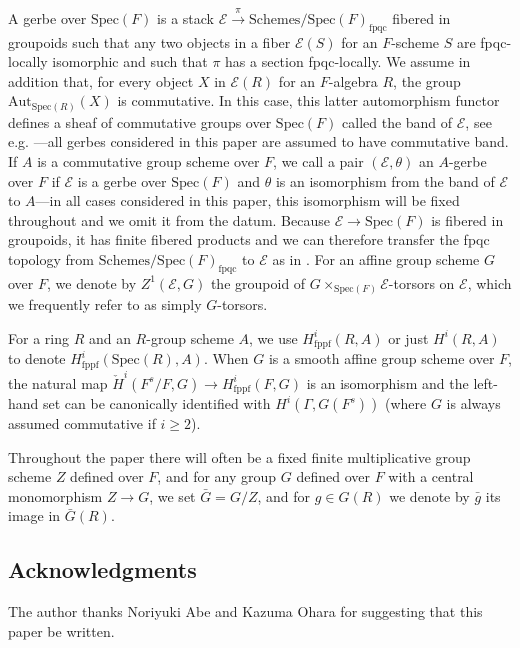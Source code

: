 \documentclass{amsart}
\theoremstyle{definition}
\theoremstyle{remark}
\newcommand\Spec{\mathrm{Spec}}
\begin{document}
A gerbe over $\Spec(F)$ is a stack $\mathcal{E} \xrightarrow{\pi} \text{Schemes/$\Spec(F)$}_{\text{fpqc}}$ fibered in groupoids such that any two objects in a fiber $\mathcal{E}(S)$ for an $F$-scheme $S$ are fpqc-locally isomorphic and such that $\pi$ has a section fpqc-locally. We assume in addition that, for every object $X$ in $\mathcal{E}(R)$ for an $F$-algebra $R$, the group $\text{Aut}_{\Spec(R)}(X)$ is commutative. In this case, this latter automorphism functor defines a sheaf of commutative groups over $\Spec(F)$ called the band of $\mathcal{E}$, see e.g. \cite[Lemma 2.27]{Dillery1}---all gerbes considered in this paper are assumed to have commutative band. If $A$ is a commutative group scheme over $F$, we call a pair $(\mathcal{E},\theta)$ an $A$-gerbe over $F$ if $\mathcal{E}$ is a gerbe over $\Spec(F)$ and $\theta$ is an isomorphism from the band of $\mathcal{E}$ to $A$---in all cases considered in this paper, this isomorphism will be fixed throughout and we omit it from the datum. Because $\mathcal{E} \to \Spec(F)$ is fibered in groupoids, it has finite fibered products and we can therefore transfer the fpqc topology from $\text{Schemes/$\Spec(F)$}_{\text{fpqc}}$ to $\mathcal{E}$ as in \cite[Definition 2.22]{Dillery1}. For an affine group scheme $G$ over $F$, we denote by $Z^{1}(\mathcal{E},G)$ the groupoid of $G \times_{\Spec(F)} \mathcal{E}$-torsors on $\mathcal{E}$, which we frequently refer to as simply $G$-torsors. 

For a ring $R$ and an $R$-group scheme $A$, we use $H^{i}_{\text{fppf}}(R,A)$ or just $H^{i}(R,A)$ to denote $H^{i}_{\text{fppf}}(\Spec(R),A)$. When $G$ is a smooth affine group scheme over $F$, the natural map $\check{H}^{i}(F^{s}/F,G) \to H^{i}_{\text{fppf}}(F,G)$ is an isomorphism and the left-hand set can be canonically identified with $H^{i}(\Gamma, G(F^{s}))$ (where $G$ is always assumed commutative if $i\geq 2$).

Throughout the paper there will often be a fixed finite multiplicative group scheme $Z$ defined over $F$, and for any group $G$ defined over $F$ with a central monomorphism $Z \to G$, we set $\bar{G}=G/Z$, and for $g \in G(R)$ we denote by $\bar{g}$ its image in $\bar{G}(R)$.

\subsection{Acknowledgments}
The author thanks Noriyuki Abe and Kazuma Ohara for suggesting that this paper be written.
\end{document}
